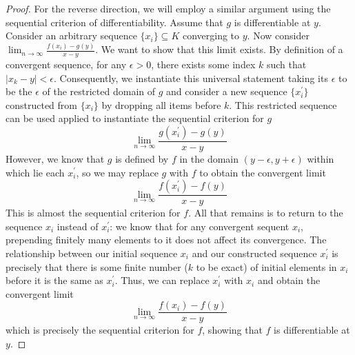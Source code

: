 \documentclass[letterpaper,11pt]{article}
\begin{document}
\begin{enumerate}
\begin{proof}
            For the reverse direction, we will employ a similar argument using
            the sequential criterion of differentiability. Assume that $g$ is
            differentiable at $y$. Consider an arbitrary sequence
            $\{x_i\} \subseteq K$ converging to $y$. Now consider
            $\lim_{n\to\infty}{\frac{f(x_i) - g(y)}{x - y}}$. We want to show
            that this limit exists. By definition of a convergent sequence,
            for any $\epsilon > 0$, there exists some index $k$ such that
            $|x_k - y| < \epsilon$. Consequently, we instantiate this universal
            statement taking its $\epsilon$ to be the $\epsilon$ of the
            restricted domain of $g$ and consider a new sequence
            $\{x_i^\prime\}$ constructed from $\{x_i\}$ by dropping all items
            before $k$. This restricted sequence can be used applied to
            instantiate the sequential criterion for $g$
            \begin{equation*}
                \lim_{n\to\infty}{
                    \frac{g(x_i^\prime) - g(y)}{x - y}
                }
            \end{equation*}
            However, we know that $g$ is defined by $f$ in the domain
            $(y-\epsilon, y+\epsilon)$ within which lie each $x_i^\prime$, so
            we may replace $g$ with $f$ to obtain the convergent limit
            \begin{equation*}
                \lim_{n\to\infty}{
                    \frac{f(x_i^\prime) - f(y)}{x - y}
                }
            \end{equation*}
            This is almost the sequential criterion for $f$. All that remains
            is to return to the sequence $x_i$ instead of $x_i^\prime$: we know
            that for any convergent sequent $x_i$, prepending finitely many
            elements to it does not affect its convergence. The relationship
            between our initial sequence $x_i$ and our constructed sequence
            $x_i^\prime$ is precisely that there is some finite number ($k$ to
            be exact) of initial elements in $x_i$ before it is the same as
            $x_i^\prime$. Thus, we can replace $x_i^\prime$ with $x_i$ and
            obtain the convergent limit
            \begin{equation*}
                \lim_{n\to\infty}{
                    \frac{f(x_i) - f(y)}{x - y}
                }
            \end{equation*}
            which is precisely the sequential criterion for $f$, showing that
            $f$ is differentiable at $y$.
        \end{proof}
\end{enumerate}
\end{document}
